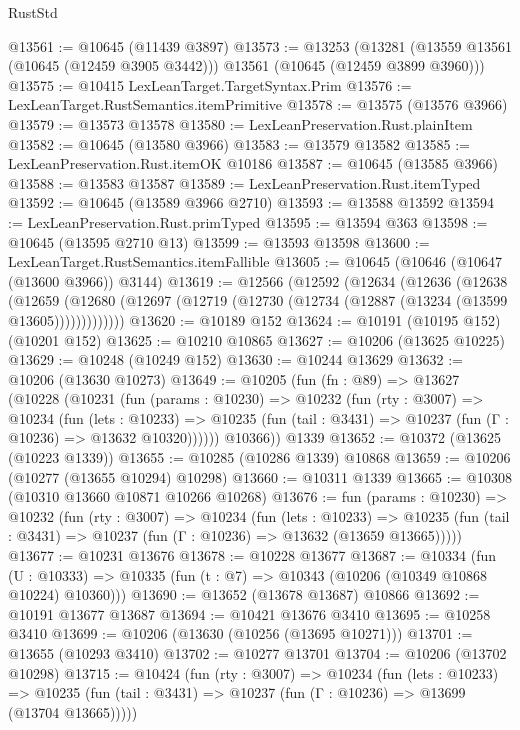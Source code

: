 \begin{lexlean}{RustStd}
\begin{coremodule}
@13561 := @10645 (@11439 @3897)
@13573 := @13253
    (@13281 (@13559 @13561 (@10645 (@12459 @3905 @3442))) @13561 (@10645 (@12459 @3899 @3960)))
@13575 := @10415 LexLeanTarget.TargetSyntax.Prim
@13576 := LexLeanTarget.RustSemantics.itemPrimitive
@13578 := @13575 (@13576 @3966)
@13579 := @13573 @13578
@13580 := LexLeanPreservation.Rust.plainItem
@13582 := @10645 (@13580 @3966)
@13583 := @13579 @13582
@13585 := LexLeanPreservation.Rust.itemOK @10186
@13587 := @10645 (@13585 @3966)
@13588 := @13583 @13587
@13589 := LexLeanPreservation.Rust.itemTyped
@13592 := @10645 (@13589 @3966 @2710)
@13593 := @13588 @13592
@13594 := LexLeanPreservation.Rust.primTyped
@13595 := @13594 @363
@13598 := @10645 (@13595 @2710 @13)
@13599 := @13593 @13598
@13600 := LexLeanTarget.RustSemantics.itemFallible
@13605 := @10645 (@10646 (@10647 (@13600 @3966)) @3144)
@13619 := @12566
    (@12592
      (@12634
        (@12636
          (@12638
            (@12659
              (@12680 (@12697 (@12719 (@12730 (@12734 (@12887 (@13234 (@13599 @13605)))))))))))))
@13620 := @10189 @152
@13624 := @10191 (@10195 @152) (@10201 @152)
@13625 := @10210 @10865
@13627 := @10206 (@13625 @10225)
@13629 := @10248 (@10249 @152)
@13630 := @10244 @13629
@13632 := @10206 (@13630 @10273)
@13649 := @10205
    (fun (fn : @89) =>
    @13627
      (@10228
        (@10231
          (fun (params : @10230) =>
          @10232
            (fun (rty : @3007) =>
            @10234
              (fun (lets : @10233) =>
              @10235 (fun (tail : @3431) => @10237 (fun (Γ : @10236) => @13632 @10320))))))
        @10366))
    @1339
@13652 := @10372 (@13625 (@10223 @1339))
@13655 := @10285 (@10286 @1339) @10868
@13659 := @10206 (@10277 (@13655 @10294) @10298)
@13660 := @10311 @1339
@13665 := @10308 (@10310 @13660 @10871 @10266 @10268)
@13676 := fun (params : @10230) =>
  @10232
    (fun (rty : @3007) =>
    @10234
      (fun (lets : @10233) =>
      @10235 (fun (tail : @3431) => @10237 (fun (Γ : @10236) => @13632 (@13659 @13665)))))
@13677 := @10231 @13676
@13678 := @10228 @13677
@13687 := @10334
    (fun (U : @10333) => @10335 (fun (t : @7) => @10343 (@10206 (@10349 @10868 @10224) @10360)))
@13690 := @13652 (@13678 @13687) @10866
@13692 := @10191 @13677 @13687
@13694 := @10421 @13676 @3410
@13695 := @10258 @3410
@13699 := @10206 (@13630 (@10256 (@13695 @10271)))
@13701 := @13655 (@10293 @3410)
@13702 := @10277 @13701
@13704 := @10206 (@13702 @10298)
@13715 := @10424
    (fun (rty : @3007) =>
    @10234
      (fun (lets : @10233) =>
      @10235 (fun (tail : @3431) => @10237 (fun (Γ : @10236) => @13699 (@13704 @13665)))))

\end{coremodule}
\end{lexlean}
